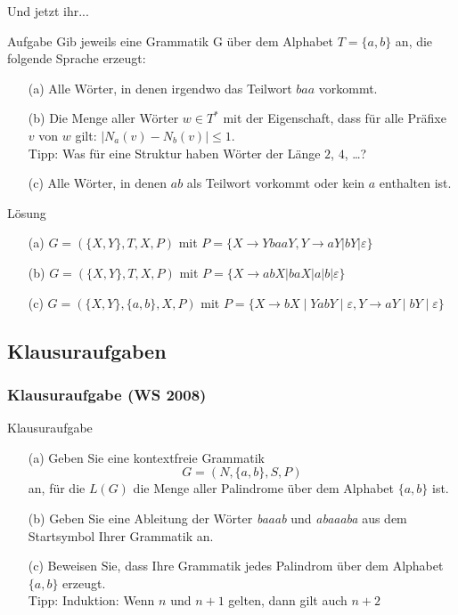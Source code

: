 \begin{frame}{Und jetzt ihr...}
\small
	\begin{exampleblock}{Aufgabe}
		Gib jeweils eine Grammatik G über dem Alphabet $T = \{a, b\}$ an, die folgende Sprache erzeugt:
		\begin{itemize}
				\item[(a)] Alle Wörter, in denen irgendwo das Teilwort $baa$ vorkommt.
				\item[(b)] Die Menge aller Wörter $w\in T^*$ mit der Eigenschaft, dass
						für alle Präfixe $v$ von $w$ gilt: $|N_a(v) - N_b(v)| \leq
						1$.\\
						Tipp: Was für eine Struktur haben Wörter der Länge $2$, $4$, \dots? \\
				\item[(c)] Alle Wörter, in denen $ab$ als Teilwort vorkommt oder kein $a$ enthalten ist.
			\end{itemize}	
	\end{exampleblock}
\pause
	\begin{block}{Lösung}
		\begin{itemize}
			\item[(a)] $G = (\{X,Y\},T,X,P)$ mit $P=\{X \to YbaaY, Y \to aY|bY|\varepsilon\}$
			\item[(b)] $G = (\{X,Y\},T,X,P)$ mit $P=\{X \to abX|baX|a|b|\varepsilon\}$
			\item[(c)] $G = (\{X, Y\}, \{a,b\}, X, P)$ mit $P = \{X \to bX \mid YabY \mid \varepsilon, Y \to aY \mid bY \mid \varepsilon\}$
		\end{itemize}
	\end{block}
\end{frame}


\subsection{Klausuraufgaben}
\begin{frame}
	\frametitle{Klausuraufgabe (WS 2008)}
	\begin{exampleblock}{Klausuraufgabe}
	\begin{itemize}
		\item[(a)] Geben Sie eine kontextfreie Grammatik $$G = (N, \{a, b\}, S, P )$$ an, für die $L(G)$ die Menge aller Palindrome über dem Alphabet $\{a, b\}$ ist.
		\item[(b)] Geben Sie eine Ableitung der Wörter \emph{baaab} und \emph{abaaaba} aus dem Startsymbol Ihrer Grammatik an.
		\item[(c)] Beweisen Sie, dass Ihre Grammatik jedes Palindrom über dem Alphabet $\{a, b\}$ erzeugt.\\
		Tipp: Induktion: Wenn $n$ und $n+1$ gelten, dann gilt auch $n+2$
	\end{itemize}		
	\end{exampleblock}
\end{frame}

